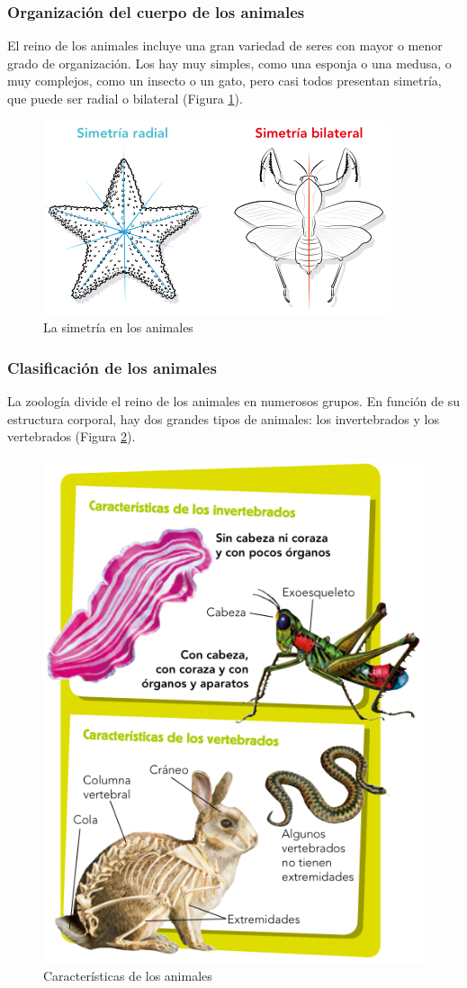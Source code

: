 \subsubsection{Organización del cuerpo de los animales}

El reino de los animales incluye una gran variedad de seres con mayor o menor grado de organización. Los hay muy simples, como una esponja o una medusa, o muy complejos, como un insecto o un gato, pero casi todos presentan simetría, que puede ser radial o bilateral (Figura \ref{fig:simetria-animal}).

\begin{figure}[!ht]
    \centering
    \includegraphics[width=0.5\linewidth]{Tema1/16_Simetria_animal.png}
    \caption{La simetría en los animales}
    \label{fig:simetria-animal}
\end{figure}

\subsubsection{Clasificación de los animales}

La zoología divide el reino de los animales en numerosos grupos. En función de su estructura corporal, hay dos grandes tipos de animales: los invertebrados y los vertebrados (Figura \ref{fig:caracteristicas-animales}).

\begin{figure}[!ht]
    \centering
    \includegraphics[width=0.4\linewidth]{Tema1/17_Caracteristicas_animales.png}
    \caption{Características de los animales}
    \label{fig:caracteristicas-animales}
\end{figure}

